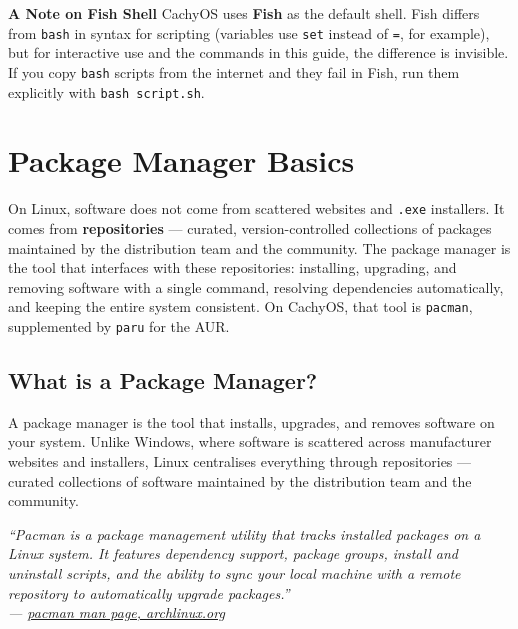 \documentclass{article}
\newcommand{\code}[1]{\colorbox{codebg}{\texttt{#1}}}
\begin{document}
\begin{callout}{\textbf{A Note on Fish Shell}}
	CachyOS uses \textbf{Fish} as the default shell. Fish differs from \code{bash}
	in syntax for scripting (variables use \code{set} instead of \code{=}, for
	example), but for interactive use and the commands in this guide, the difference
	is invisible. If you copy \code{bash} scripts from the internet and they fail in
	Fish, run them explicitly with \code{bash script.sh}.
\end{callout}

\newpage
\section{Package Manager Basics}

On Linux, software does not come from scattered websites and \code{.exe} installers.
It comes from \textbf{repositories} --- curated, version-controlled collections of
packages maintained by the distribution team and the community. The package manager
is the tool that interfaces with these repositories: installing, upgrading, and
removing software with a single command, resolving dependencies automatically, and
keeping the entire system consistent. On CachyOS, that tool is \code{pacman},
supplemented by \code{paru} for the AUR.

\subsection{What is a Package Manager?}

A package manager is the tool that installs, upgrades, and removes software on your
system. Unlike Windows, where software is scattered across manufacturer websites and
installers, Linux centralises everything through repositories --- curated collections
of software maintained by the distribution team and the community.

\begin{mdframed}[linewidth=1.5pt, linecolor=black!50, topline=true, bottomline=true,
	leftline=false, rightline=false, backgroundcolor=black!3]
	\small\itshape
	``Pacman is a package management utility that tracks installed packages on a
	Linux system. It features dependency support, package groups, install and
	uninstall scripts, and the ability to sync your local machine with a remote
	repository to automatically upgrade packages.''\\[4pt]
	\normalfont\small ---
	\href{https://archlinux.org/pacman/pacman.8.html}{pacman man page, archlinux.org}
\end{mdframed}
\end{document}
